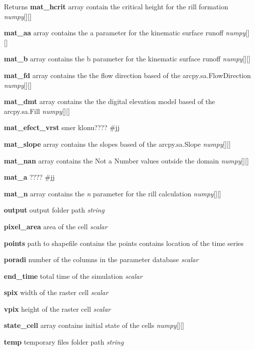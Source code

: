 \begin{DoxyReturn}{Returns}
{\bfseries mat\-\_\-hcrit} array contain the critical height for the rill formation {\itshape numpy}\mbox{[}\mbox{]}\mbox{[}\mbox{]} 

{\bfseries mat\-\_\-aa} array contains the a parameter for the kinematic surface runoff {\itshape numpy}\mbox{[}\mbox{]}\mbox{[}\mbox{]} 

{\bfseries mat\-\_\-b} array contains the b parameter for the kinematic surface runoff {\itshape numpy}\mbox{[}\mbox{]}\mbox{[}\mbox{]} 

{\bfseries mat\-\_\-fd} array contains the the flow direction based of the arcpy.\-sa.\-Flow\-Direction {\itshape numpy}\mbox{[}\mbox{]}\mbox{[}\mbox{]} 

{\bfseries mat\-\_\-dmt} array contains the the digital elevation model based of the arcpy.\-sa.\-Fill {\itshape numpy}\mbox{[}\mbox{]}\mbox{[}\mbox{]} 

{\bfseries mat\-\_\-efect\-\_\-vrst} smer klonu???? \#jj 

{\bfseries mat\-\_\-slope} array contains the slopes based of the arcpy.\-sa.\-Slope {\itshape numpy}\mbox{[}\mbox{]}\mbox{[}\mbox{]} 

{\bfseries mat\-\_\-nan} array contains the Not a Number values outside the domain {\itshape numpy}\mbox{[}\mbox{]}\mbox{[}\mbox{]} 

{\bfseries mat\-\_\-a} ???? \#jj 

{\bfseries mat\-\_\-n} array contains the {\itshape n} parameter for the rill calculation {\itshape numpy}\mbox{[}\mbox{]}\mbox{[}\mbox{]} 

{\bfseries output} output folder path {\itshape string} 

{\bfseries pixel\-\_\-area} area of the cell {\itshape scalar} 

{\bfseries points} path to shapefile contains the points contains location of the time series 

{\bfseries poradi} number of the columns in the parameter database {\itshape scalar} 

{\bfseries end\-\_\-time} total time of the simulation {\itshape scalar} 

{\bfseries spix} width of the raster cell {\itshape scalar} 

{\bfseries vpix} height of the raster cell {\itshape scalar} 

{\bfseries state\-\_\-cell} array contains initial state of the cells {\itshape numpy}\mbox{[}\mbox{]}\mbox{[}\mbox{]} 

{\bfseries temp} temporary files folder path {\itshape string} 


\end{DoxyReturn}
